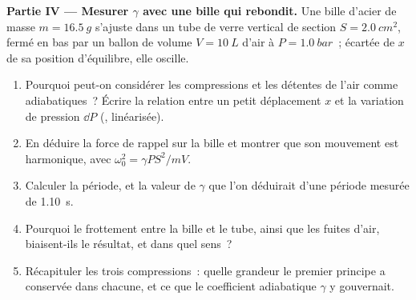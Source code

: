 \begin{problem}
\medskip
\noindent\textbf{Partie IV --- Mesurer $\gamma$ avec une bille qui rebondit.}
Une bille d'acier de masse $m = \qty{16.5}{g}$ s'ajuste dans un tube de
verre vertical de section $S = \qty{2.0}{cm^2}$, fermé en bas par un ballon
de volume $V = \qty{10}{L}$ d'air à $P = \qty{1.0}{bar}$~; écartée de $x$ de
sa position d'équilibre, elle oscille.
\begin{enumerate}[resume]
  \item Pourquoi peut-on considérer les compressions et les détentes de
        l'air comme adiabatiques~? Écrire la relation entre un petit
        déplacement $x$ et la variation de pression $\dd P$ (, linéarisée).
  \item En déduire la force de rappel sur la bille et montrer que son
        mouvement est harmonique, avec $\omega_0^2 = \gamma PS^2/mV$.
  \item Calculer la période, et la valeur de $\gamma$ que l'on déduirait
        d'une période mesurée de \qty{1.10}{s}.
  \item Pourquoi le frottement entre la bille et le tube, ainsi que les
        fuites d'air, biaisent-ils le résultat, et dans quel sens~?
  \item Récapituler les trois compressions~: quelle grandeur le premier
        principe a conservée dans chacune, et ce que le coefficient
        adiabatique $\gamma$ y gouvernait.
\end{enumerate}
\end{problem}
